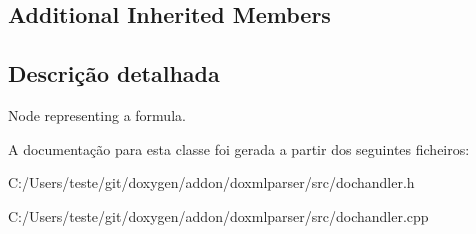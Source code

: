 \subsection*{Additional Inherited Members}


\subsection{Descrição detalhada}
Node representing a formula. 



A documentação para esta classe foi gerada a partir dos seguintes ficheiros\-:\begin{DoxyCompactItemize}
\item 
C\-:/\-Users/teste/git/doxygen/addon/doxmlparser/src/dochandler.\-h\item 
C\-:/\-Users/teste/git/doxygen/addon/doxmlparser/src/dochandler.\-cpp\end{DoxyCompactItemize}
